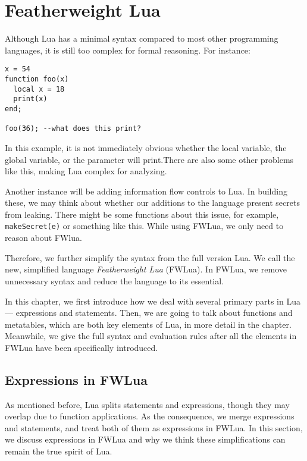 \newcommand{\abFunction}[2]{{\tt function} ~{#1}~{\tt return}~{#2}~{\tt end}}
\newcommand{\semanticFullRaw}[4]{{#1},{#2} \Downarrow {#3},{#4}}
\newcommand{\semanticFull}[4]{{#1},{#2} \Downarrow {#3}, {#4}}

\chapter{Featherweight Lua}\label{chp: FWLua}
Although Lua has a minimal syntax compared to most other programming languages, it is still too complex for formal reasoning. For instance:

\begin{verbatim}
x = 54
function foo(x)
  local x = 18
  print(x)
end;

foo(36); --what does this print?
\end{verbatim}

In this example, it is not immediately obvious whether the local variable,
the global variable, or the parameter will print.There are also some other problems like this, making Lua complex for analyzing. 

Another instance will be adding information flow controls to Lua. In building these, we may think about whether our additions to the language present secrets from leaking. There might be some functions about this issue, for example, {\tt makeSecret(e)} or something like this. While using FWLua, we only need to reason about FWlua.

Therefore, we further simplify the syntax from the full version Lua. We call the new, simplified language {\it Featherweight Lua} (FWLua). In FWLua, we remove unnecessary syntax and reduce the language to its essential.

In this chapter, we first introduce how we deal with several primary parts in Lua --- expressions and statements. Then, we are going to talk about functions and metatables, which are both key elements of Lua, in more detail in the chapter. Meanwhile, we give the full syntax and evaluation rules after all the elements in FWLua have been specifically introduced.

\section{Expressions in FWLua}
As mentioned before, Lua splits statements and expressions, though they may overlap due to function applications. As the consequence, we merge expressions and statements, and treat both of them as expressions in FWLua. In this section, we discuss expressions in FWLua and why we think these simplifications can remain the true spirit of Lua. 

